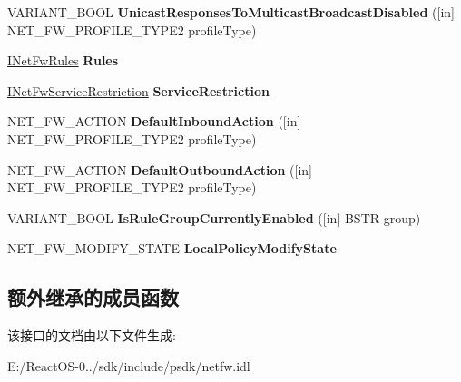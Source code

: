 \begin{DoxyCompactItemize}
V\+A\+R\+I\+A\+N\+T\+\_\+\+B\+O\+OL {\bfseries Unicast\+Responses\+To\+Multicast\+Broadcast\+Disabled} (\mbox{[}in\mbox{]} N\+E\+T\+\_\+\+F\+W\+\_\+\+P\+R\+O\+F\+I\+L\+E\+\_\+\+T\+Y\+P\+E2 profile\+Type)
\item 
\mbox{\label{interface_i_net_fw_policy2_ac8e06b10c69a24dfb4701b23342829a1}} 
\hyperlink{interface_i_net_fw_rules}{I\+Net\+Fw\+Rules} {\bfseries Rules}
\item 
\mbox{\label{interface_i_net_fw_policy2_a51cfbd85378e3287a9d035e7d1c2ce1d}} 
\hyperlink{interface_i_net_fw_service_restriction}{I\+Net\+Fw\+Service\+Restriction} {\bfseries Service\+Restriction}
\item 
\mbox{\label{interface_i_net_fw_policy2_ae07dcb13b788dcda5458a3a5518b0c5c}} 
N\+E\+T\+\_\+\+F\+W\+\_\+\+A\+C\+T\+I\+ON {\bfseries Default\+Inbound\+Action} (\mbox{[}in\mbox{]} N\+E\+T\+\_\+\+F\+W\+\_\+\+P\+R\+O\+F\+I\+L\+E\+\_\+\+T\+Y\+P\+E2 profile\+Type)
\item 
\mbox{\label{interface_i_net_fw_policy2_acfd0c577e918bdf80231ea25c5da5c9a}} 
N\+E\+T\+\_\+\+F\+W\+\_\+\+A\+C\+T\+I\+ON {\bfseries Default\+Outbound\+Action} (\mbox{[}in\mbox{]} N\+E\+T\+\_\+\+F\+W\+\_\+\+P\+R\+O\+F\+I\+L\+E\+\_\+\+T\+Y\+P\+E2 profile\+Type)
\item 
\mbox{\label{interface_i_net_fw_policy2_ab61d3016cf6d6fbc8a741ce146061606}} 
V\+A\+R\+I\+A\+N\+T\+\_\+\+B\+O\+OL {\bfseries Is\+Rule\+Group\+Currently\+Enabled} (\mbox{[}in\mbox{]} B\+S\+TR group)
\item 
\mbox{\label{interface_i_net_fw_policy2_abb6ffdecffe7f8bdfd9c993ad29a8759}} 
N\+E\+T\+\_\+\+F\+W\+\_\+\+M\+O\+D\+I\+F\+Y\+\_\+\+S\+T\+A\+TE {\bfseries Local\+Policy\+Modify\+State}
\end{DoxyCompactItemize}
\subsection*{额外继承的成员函数}


该接口的文档由以下文件生成\+:\begin{DoxyCompactItemize}
\item 
E\+:/\+React\+O\+S-\/0../sdk/include/psdk/netfw.\+idl\end{DoxyCompactItemize}
